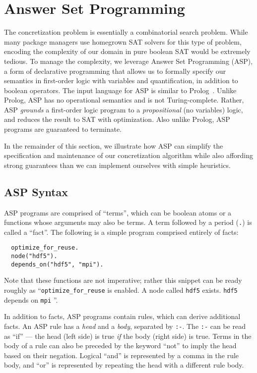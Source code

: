 \section{Answer Set Programming}
\label{sec:asp}

The concretization problem is essentially a combinatorial search problem. While many
package managers use homegrown SAT solvers for this type of problem, encoding the
complexity of our domain in pure boolean SAT would be extremely tedious. To manage the
complexity, we leverage Answer Set Programming (ASP), a form of declarative programming
that allows us to formally specify our semantics in first-order logic with variables and
quantification, in addition to boolean operators. The input language for ASP is similar
to Prolog~\cite{baral_2003}. Unlike Prolog, ASP has no operational semantics and is not
Turing-complete. Rather, ASP {\it grounds} a first-order logic program to a {\it
  propositional} (no variables) logic, and reduces the result to SAT with optimization.
Also unlike Prolog, ASP programs are guaranteed to terminate.

In the remainder of this section, we illustrate how ASP can simplify the specification
and maintenance of our concretization algorithm while also affording strong guarantees
than we can implement ourselves with simple heuristics.

\subsection{ASP Syntax}

ASP programs are comprised of ``terms'', which can be boolean atoms or a functions whose
arguments may also be terms. A term followed by a period ({\tt .}) is called a ``fact''.
The following is a simple program comprised entirely of facts:

\begin{verbatim}
  optimize_for_reuse.
  node("hdf5").
  depends_on("hdf5", "mpi").
\end{verbatim}

Note that these functions are not imperative; rather this snippet can be ready roughly
as ``{\tt optimize\_for\_reuse} is enabled. A node called {\tt hdf5} exists. {\tt hdf5} depends on {\tt mpi} ''.

In addition to facts, ASP programs contain rules, which can derive additional facts. An
ASP rule has a {\it head} and a {\it body}, separated by \texttt{:-}. The \texttt{:-}
can be read as ``if'' --- the head (left side) is true {\it if} the body (right side) is true.
Terms in the body of a rule can also be preceded by the keyword ``not'' to imply the
head based on their negation. Logical ``and'' is represented by a comma in the rule
body, and ``or'' is represented by repeating the head with a different rule body.

